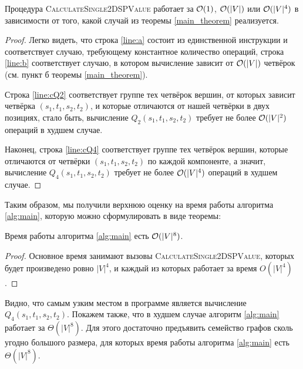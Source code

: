 \begin{proposition}
Процедура \textsc{CalculateSingle2DSPValue} работает за $\mathcal{O}(1)$, $\mathcal{O}(|V|)$ или $\mathcal{O}(|V|^4)$ в зависимости от того, какой случай из теоремы \ref{main_theorem} реализуется.
\end{proposition}
\begin{proof}
Легко видеть, что строка \ref{line:a} состоит из единственной инструкции и соответствует случаю, требующему константное количество операций, строка \ref{line:b} соответствует случаю, в котором вычисление зависит от $\mathcal{O}(|V|)$ четвёрок (см. пункт б теоремы \ref{main_theorem}). 

Строка \ref{line:cQ2} соответствует группе тех четвёрок вершин, от которых зависит четвёрка $(s_1, t_1, s_2, t_2)$, и которые отличаются от нашей четвёрки в двух позициях, стало быть, вычисление $Q_2(s_1, t_1, s_2, t_2)$ требует не более $\mathcal{O}(|V|^2)$ операций в худшем случае.

Наконец, строка \ref{line:cQ4} соответствует группе тех четвёрок вершин, которые отличаются от четвёрки $(s_1, t_1, s_2, t_2)$ по каждой компоненте, а значит, вычисление $Q_4(s_1, t_1, s_2, t_2)$ требует не более $\mathcal{O}(|V|^4)$ операций в худшем случае.
\end{proof}

Таким образом, мы получили верхнюю оценку на время работы алгоритма \ref{alg:main}, которую можно сформулировать в виде теоремы:

\begin{theorem}
Время работы алгоритма \ref{alg:main} есть $\mathcal{O}(|V|^8)$.
\end{theorem}
\begin{proof}
Основное время занимают вызовы \textsc{CalculateSingle2DSPValue}, которых будет произведено ровно $|V|^4$, и каждый из которых работает за время $O(|V|^4)$.
\end{proof}

Видно, что самым узким местом в программе является вычисление $Q_4(s_1, t_1, s_2, t_2)$. Покажем также, что в худшем случае алгоритм \ref{alg:main} работает за $\Theta(|V|^8)$. Для этого достаточно предъявить семейство графов сколь угодно большого размера, для которых время работы алгоритма \ref{alg:main} есть $\Theta(|V|^8)$.

